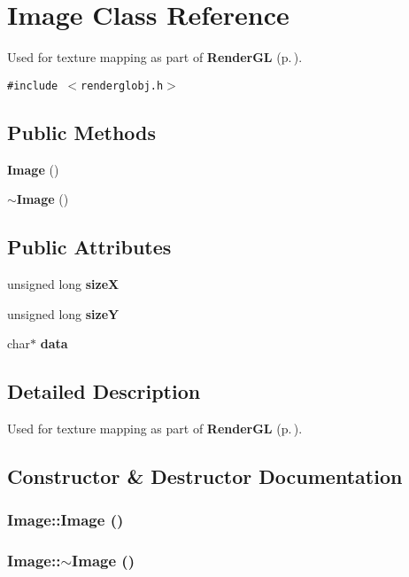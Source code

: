 \section{Image  Class Reference}
\label{class_Image}
Used for texture mapping as part of {\bf Render\-GL} {\rm (p.\,\pageref{class_RenderGL})}. 


{\tt \#include $<$renderglobj.h$>$}

\subsection*{Public Methods}
\begin{CompactItemize}
\item 
{\bf Image} ()
\item 
{\bf $\sim$Image} ()
\end{CompactItemize}
\subsection*{Public Attributes}
\begin{CompactItemize}
\item 
unsigned long {\bf size\-X}
\item 
unsigned long {\bf size\-Y}
\item 
char$\ast$ {\bf data}
\end{CompactItemize}


\subsection{Detailed Description}
Used for texture mapping as part of {\bf Render\-GL} {\rm (p.\,\pageref{class_RenderGL})}.



\subsection{Constructor \& Destructor Documentation}
\subsubsection{\setlength{\rightskip}{0pt plus 5cm}Image::Image ()}\label{class_Image_a0}


\subsubsection{\setlength{\rightskip}{0pt plus 5cm}Image::$\sim$Image ()}\label{class_Image_a1}




